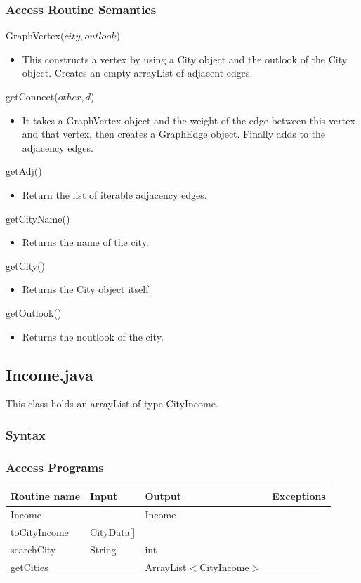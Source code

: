 \documentclass[12pt,fleqn]{article}
\begin{document}
\subsubsection*{Access Routine Semantics}
\noindent GraphVertex($city, outlook$)
\begin{itemize}
\item This constructs a vertex by using a City object and the outlook of the City object. Creates an empty arrayList of adjacent edges.
\end{itemize}
\noindent getConnect($other, d$)
\begin{itemize}
\item It takes a GraphVertex object and the weight of the edge between this vertex and that vertex, then creates a GraphEdge object. Finally adds to the adjacency edges.
\end{itemize}
\noindent getAdj()
\begin{itemize}
\item Return the list of iterable adjacency edges.
\end{itemize}
\noindent getCityName()
\begin{itemize}
\item Returns the name of the city.
\end{itemize}
\noindent getCity()
\begin{itemize}
\item Returns the City object itself.
\end{itemize}
\noindent getOutlook()
\begin{itemize}
\item Returns the noutlook of the city.
\end{itemize}

\subsection*{Income.java}\label{income}
This class holds an arrayList of type CityIncome.
\subsubsection* {Syntax}

\subsubsection* {Access Programs}
\begin{tabular}{| l | l | l | l |}
\hline
\textbf{Routine name} & \textbf{Input} & \textbf{Output} & \textbf{Exceptions}\\
\hline
Income & ~ & Income& ~\\
\hline
toCityIncome & CityData[] & ~ & ~\\
\hline
searchCity & String & int & ~\\
\hline
getCities & ~ & ArrayList$<$CityIncome$>$ & ~\\
\hline
\end{tabular}
\end{document}
